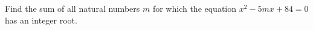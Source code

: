 Find the sum of all natural numbers $m$ for which the equation $x^{2}-5mx+84=0$ has an integer root.

